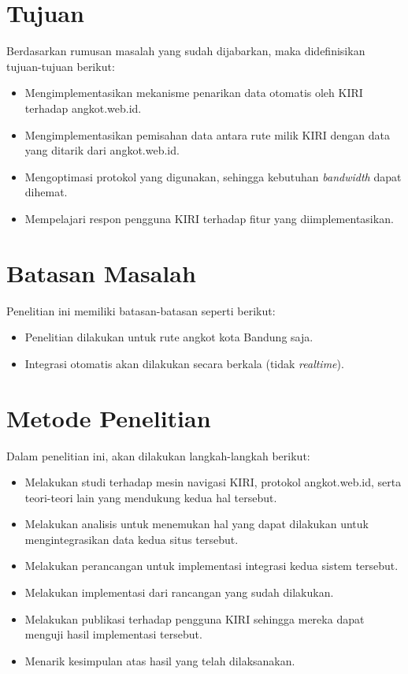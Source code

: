 \section{Tujuan}
\label{sec:tujuan}
Berdasarkan rumusan masalah yang sudah dijabarkan, maka didefinisikan tujuan-tujuan
berikut:
\begin{itemize}
	\item Mengimplementasikan mekanisme penarikan data otomatis oleh KIRI
		terhadap angkot.web.id.
	\item Mengimplementasikan pemisahan data antara rute milik KIRI dengan data
		yang ditarik dari angkot.web.id.
	\item Mengoptimasi protokol yang digunakan, sehingga kebutuhan
		\textit{bandwidth} dapat dihemat.
	\item Mempelajari respon pengguna KIRI terhadap fitur yang diimplementasikan.
\end{itemize}

\section{Batasan Masalah}
\label{sec:batasan_masalah}
Penelitian ini memiliki batasan-batasan seperti berikut:
\begin{itemize}
	\item Penelitian dilakukan untuk rute angkot kota Bandung saja.
	\item Integrasi otomatis akan dilakukan secara berkala
		(tidak \textit{realtime}).
\end{itemize}
\section{Metode Penelitian}
\label{sec:metode_penelitian}
Dalam penelitian ini, akan dilakukan langkah-langkah berikut:
\begin{itemize}
	\item Melakukan studi terhadap mesin navigasi KIRI, protokol angkot.web.id,
		serta teori-teori lain yang mendukung kedua hal tersebut.
	\item Melakukan analisis untuk menemukan hal yang dapat dilakukan untuk
		mengintegrasikan data kedua situs tersebut.
	\item Melakukan perancangan untuk implementasi integrasi kedua sistem
		tersebut.
	\item Melakukan implementasi dari rancangan yang sudah dilakukan.
	\item Melakukan publikasi terhadap pengguna KIRI sehingga mereka dapat
		menguji hasil implementasi tersebut.
	\item Menarik kesimpulan atas hasil yang telah dilaksanakan.
\end{itemize}

